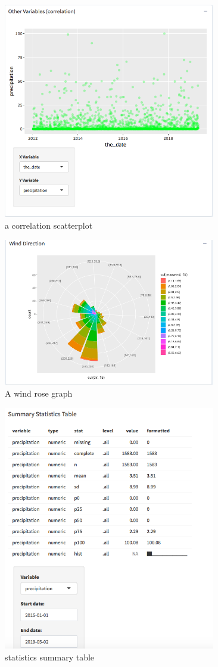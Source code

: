 \documentclass[10pt,letterpaper]{article}
\begin{document}
\begin{figure}
\includegraphics[width=350px]{correlation} \caption{a correlation scatterplot}\label{fig:unnamed-chunk-6}
\end{figure}

\begin{figure}
\includegraphics[width=350px]{WindRose} \caption{A wind rose graph}\label{fig:unnamed-chunk-7}
\end{figure}

\begin{figure}
\includegraphics[width=350px]{table} \caption{statistics summary table}\label{fig:unnamed-chunk-8}
\end{figure}
\end{document}
